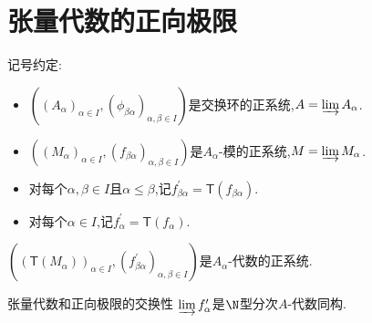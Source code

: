 \section{张量代数的正向极限}

记号约定:
\begin{itemize}
	\item $\left(\left(A_{\alpha}\right)_{\alpha\in I},\left(\phi_{\beta\alpha}\right)_{\alpha,\beta\in I}\right)$是交换环的正系统,$A=\varinjlim A_{\alpha}$.
	\item $\left(\left(M_{\alpha}\right)_{\alpha\in I},\left(f_{\beta\alpha}\right)_{\alpha,\beta\in I}\right)$是$A_{\alpha}$-模的正系统,$M=\varinjlim M_{\alpha}$.
	\item 对每个$\alpha,\beta\in I$且$\alpha\leq\beta$,记$f_{\beta\alpha}^{\prime}=\mathsf{T}\left(f_{\beta\alpha}\right)$.
	\item 对每个$\alpha\in I$,记$f_{\alpha}^{\prime}=\mathsf{T}\left(f_{\alpha}\right)$.
\end{itemize}

\begin{proposition}{}{}
	$\left(\left(\mathsf{T}\left(M_{\alpha}\right)\right)_{\alpha\in I},\left(f_{\beta\alpha}^{\prime}\right)_{\alpha,\beta\in I}\right)$是$A_{\alpha}$-代数的正系统.
\end{proposition}

\begin{proposition}{张量代数和正向极限的交换性}{}
	$\varinjlim f_{\alpha}^{\prime}$是$\N$型分次$A$-代数同构.
\end{proposition}


























